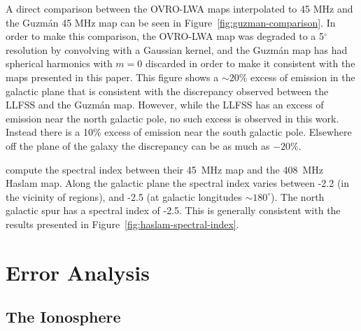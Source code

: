 \documentclass[twocolumn]{aastex61}
\begin{document}
A direct comparison between the OVRO-LWA maps interpolated to 45 MHz and the Guzm\'{a}n 45 MHz map
can be seen in Figure~\ref{fig:guzman-comparison}. In order to make this comparison, the OVRO-LWA
map was degraded to a 5$^\circ$ resolution by convolving with a Gaussian kernel, and the Guzm\'{a}n
map has had spherical harmonics with $m=0$ discarded in order to make it consistent with the maps
presented in this paper. This figure shows a $\sim20\%$ excess of emission in the galactic plane
that is consistent with the discrepancy observed between the LLFSS and the Guzm\'{a}n map.  However,
while the LLFSS has an excess of emission near the north galactic pole, no such excess is observed
in this work. Instead there is a 10\% excess of emission near the south galactic pole. Elsewhere off
the plane of the galaxy the discrepancy can be as much as $-20\%$.

\citet{2011A&A...525A.138G} compute the spectral index between their 45~MHz map and the 408~MHz
Haslam map. Along the galactic plane the spectral index varies between -2.2 (in the vicinity of
 regions), and -2.5 (at galactic longitudes $\sim 180^\circ$). The north galactic spur has
a spectral index of -2.5. This is generally consistent with the results presented in
Figure~\ref{fig:haslam-spectral-index}.

\section{Error Analysis}\label{sec:error}

\subsection{The Ionosphere}\label{sec:ionosphere}
\end{document}
